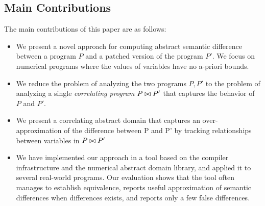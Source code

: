 \subsection{Main Contributions}
The main contributions of this paper are as follows:
\begin{itemize}
\item We present a novel approach for computing abstract semantic difference between a program $P$ and a patched version of the program $P'$. We focus on numerical programs where the values of variables have no a-priori bounds.
\item We reduce the problem of analyzing the two programs $P,P'$ to the problem of analyzing a single \emph{correlating program} $P \bowtie P'$ that captures the behavior of $P$ and $P'$.
\item We present a correlating abstract domain that captures an over-approximation of the difference between P and P' by tracking relationships between variables in $P \bowtie P'$
\item We have implemented our approach in a tool based on the  compiler infrastructure and the  numerical abstract domain library, and applied it to several real-world programs. Our evaluation shows that the tool often manages to establish equivalence, reports useful approximation of semantic differences when differences exists, and reports only a few false differences.
\end{itemize}